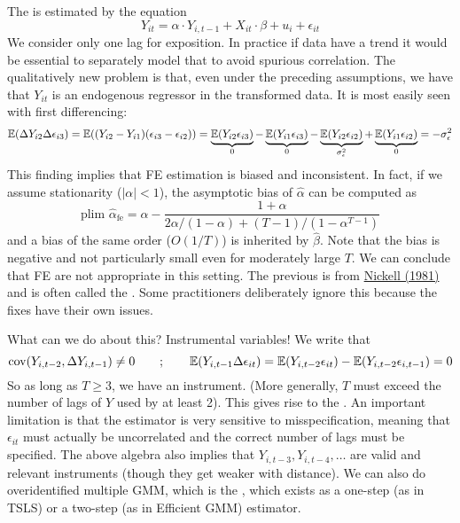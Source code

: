 \documentclass[10pt]{article}
\begin{document}
\begin{definition}
	The  is estimated by the equation \[Y_{it} = \alpha\cdot Y_{i,t-1} + X_{it}\cdot \beta + u_i + \epsilon_{it}\]We consider only one lag for exposition. In practice if data have a trend it would be essential to separately model that to avoid spurious correlation. The qualitatively new problem is that, even under the preceding assumptions, we have that $Y_{it}$ is an endogenous regressor in the transformed data. It is most easily seen with first differencing:\[\mathbb{E}(\Delta Y_{i2} \Delta \epsilon_{i3})= \mathbb{E}((Y_{i2} - Y_{i1})(\epsilon_{i3} - \epsilon_{i2})) = \underbrace{\mathbb{E}(Y_{i2}\epsilon_{i3})}_{0} - \underbrace{\mathbb{E}(Y_{i1}\epsilon_{i3})}_{0} - \underbrace{\mathbb{E}(Y_{i2}\epsilon_{i2})}_{\sigma^2_\epsilon} + \underbrace{\mathbb{E}(Y_{i1}\epsilon_{i2})}_{0} = -\sigma^2_\epsilon\]This finding implies that FE estimation is biased and inconsistent. In fact, if we assume stationarity ($|\alpha|<1$), the asymptotic bias of $\hat{\alpha}$ can be computed as \[\text{plim } \hat{\alpha}_{\text{fe}} = \alpha - \frac{1+\alpha}{2\alpha / (1-\alpha) + (T-1)/(1-\alpha^{T-1})}\]and a bias of the same order (\ie $O(1/T)$) is inherited by $\hat{\beta}$. Note that the bias is negative and not particularly small even for moderately large $T$. We can conclude that FE are not appropriate in this setting. The previous is from \href{https://www.jstor.org/stable/1911408}{Nickell (1981)} and is often called the . Some practitioners deliberately ignore this because the fixes have their own issues.
\end{definition}

\begin{remark}
	What can we do about this? Instrumental variables! We write that \[\mathop{\rm cov}(Y_{i,t-2},\Delta Y_{i,t-1}) \ne 0 \qquad ; \qquad \mathbb{E}(Y_{i,t-1}\Delta \epsilon_{it}) = \mathbb{E}(Y_{i,t-2}\epsilon_{it}) - \mathbb{E}(Y_{i,t-2}\epsilon_{i,t-1}) = 0\]So as long as $T \ge 3$, we have an instrument. (More generally, $T$ must exceed the number of lags of $Y$ used by at least 2). This gives rise to the . An important limitation is that the estimator is very sensitive to misspecification, meaning that $\epsilon_{it}$ must actually be uncorrelated and the correct number of lags must be specified. The above algebra also implies that $Y_{i,t-3}, Y_{i,t-4},\dots$ are valid and relevant instruments (though they get weaker with distance). We can also do overidentified multiple GMM, which is the , which exists as a one-step (as in TSLS) or a two-step (as in Efficient GMM) estimator.
\end{remark}
\end{document}
